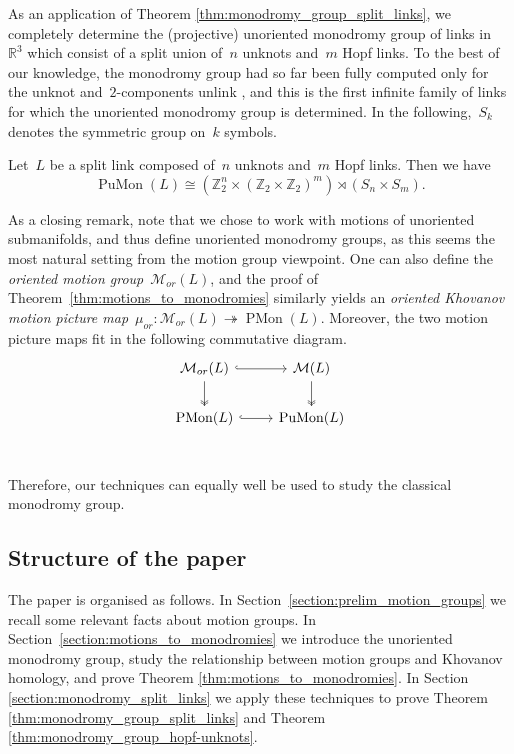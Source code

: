 \documentclass{amsart}
\theoremstyle{definition}
\newenvironment{customthm}[1]
  {\renewcommand\theinnercustomthm{#1}\innercustomthm}
  {\endinnercustomthm}
\theoremstyle{definition}
\theoremstyle{definition}
\theoremstyle{definition}
\newcommand{\Z}{\mathbb{Z}}
\DeclareMathOperator{\PuMon}{PuMon}
\DeclareMathOperator{\PMon}{PMon}
\begin{document}
As an application of Theorem \ref{thm:monodromy_group_split_links}, we completely determine the (projective) unoriented monodromy group of links in~$\mathbb{R}^3$ which consist of a split union of~$n$ unknots and~$m$ Hopf links. 
To the best of our knowledge, the monodromy group had so far been fully computed only for the unknot and~$2$-components unlink \cite{Collari}, and this is the first infinite family of links for which the unoriented monodromy group is determined. In the following,~$S_k$ denotes the symmetric group on~$k$ symbols.

\begin{customthm}{C}\label{thm:monodromy_group_hopf-unknots}
    Let~$L$ be a split link composed of~$n$ unknots and~$m$ Hopf links. Then we have 
   ~$$\PuMon(L)\cong \left(\Z_2^n \times (\Z_2\times \Z_2)^m\right) \rtimes (S_n\times S_m).$$
\end{customthm}

As a closing remark, note that we chose to work with motions of unoriented submanifolds, and thus define unoriented monodromy groups, as this seems the most natural setting from the motion group viewpoint. One can also define the \textit{oriented motion group}~$\mathcal{M}_{or}(L)$, and the proof of Theorem~\ref{thm:motions_to_monodromies} similarly yields an \emph{oriented Khovanov motion picture map}~$\mu_{or} \colon  \mathcal{M}_{or}(L) \twoheadrightarrow \PMon(L)$. Moreover, the two motion picture maps fit in the following commutative diagram.
\[\begin{tikzcd}
	{\mathcal{M}_{or}(L)} & {\mathcal{M}(L)} \\
	{\PMon(L)} & {\PuMon(L) } \\
	\arrow[two heads, from=1-1, to=2-1]
	\arrow[two heads, from=1-2, to=2-2]
	\arrow[hook, from=1-1, to=1-2]
    \arrow[hook, from=2-1, to=2-2]
\end{tikzcd}\]
 Therefore, our techniques can equally well be used to study the classical monodromy group.
 
\subsection*{Structure of the paper}
The paper is organised as follows. In Section~\ref{section:prelim_motion_groups} we recall some relevant facts about motion groups.  In Section~\ref{section:motions_to_monodromies} we introduce the unoriented monodromy group, study the relationship between motion groups and Khovanov homology, and prove Theorem \ref{thm:motions_to_monodromies}. In Section \ref{section:monodromy_split_links} we apply these techniques to prove Theorem \ref{thm:monodromy_group_split_links} and Theorem \ref{thm:monodromy_group_hopf-unknots}.
\end{document}
